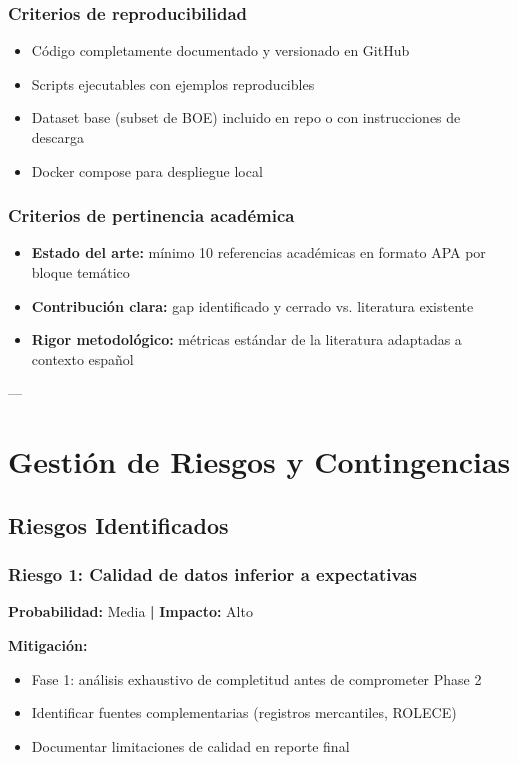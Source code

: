 \documentclass[11pt,a4paper,spanish]{book}
\numberwithin{equation}{chapter}
\numberwithin{figure}{chapter}
\begin{document}
\subsection{Criterios de reproducibilidad}

\begin{itemize}
\item Código completamente documentado y versionado en GitHub
\item Scripts ejecutables con ejemplos reproducibles
\item Dataset base (subset de BOE) incluido en repo o con instrucciones de descarga
\item Docker compose para despliegue local
\end{itemize}

\subsection{Criterios de pertinencia académica}

\begin{itemize}
\item \textbf{Estado del arte:} mínimo 10 referencias académicas en formato APA por bloque temático
\item \textbf{Contribución clara:} gap identificado y cerrado vs. literatura existente
\item \textbf{Rigor metodológico:} métricas estándar de la literatura adaptadas a contexto español
\end{itemize}

---

\chapter{Gestión de Riesgos y Contingencias}

\section{Riesgos Identificados}

\subsection{Riesgo 1: Calidad de datos inferior a expectativas}

\textbf{Probabilidad:} Media \textbf{|} \textbf{Impacto:} Alto

\textbf{Mitigación:}
\begin{itemize}
\item Fase 1: análisis exhaustivo de completitud antes de comprometer Phase 2
\item Identificar fuentes complementarias (registros mercantiles, ROLECE)
\item Documentar limitaciones de calidad en reporte final
\end{itemize}
\end{document}
